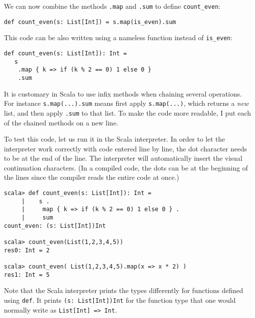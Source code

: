 We can now combine the methods \texttt{}\lstinline!.map!
and \texttt{}\lstinline!.sum!
to define \lstinline!count_even!:

\begin{lstlisting}
def count_even(s: List[Int]) = s.map(is_even).sum
\end{lstlisting}
This code can be also written using a nameless function instead of
\lstinline!is_even!:

\begin{lstlisting}
def count_even(s: List[Int]): Int =
   s
    .map { k => if (k % 2 == 0) 1 else 0 }
    .sum
\end{lstlisting}
It is customary in Scala to use infix methods when chaining several
operations. For instance \lstinline!s.map(...).sum!
means first apply \lstinline!s.map(...)!,
which returns a \emph{new} list, and then apply \texttt{}\lstinline!.sum!
to that list. To make the code more readable, I put each of the chained
methods on a new line. 

To test this code, let us run it in the Scala interpreter. In order
to let the interpreter work correctly with code entered line by line,
the dot character needs to be at the end of the line. The interpreter
will automatically insert the visual continuation characters. (In
a compiled code, the dots can be at the beginning of the lines since
the compiler reads the entire code at once.)
\begin{lstlisting}
scala> def count_even(s: List[Int]): Int =
     |    s .
     |     map { k => if (k % 2 == 0) 1 else 0 } .
     |     sum
count_even: (s: List[Int])Int

scala> count_even(List(1,2,3,4,5))
res0: Int = 2

scala> count_even( List(1,2,3,4,5).map(x => x * 2) )
res1: Int = 5
\end{lstlisting}
Note that the Scala interpreter prints the types differently for functions
defined using \lstinline!def!.
It prints \lstinline!(s: List[Int])Int!
for the function type that one would normally write as \lstinline!List[Int] => Int!.

